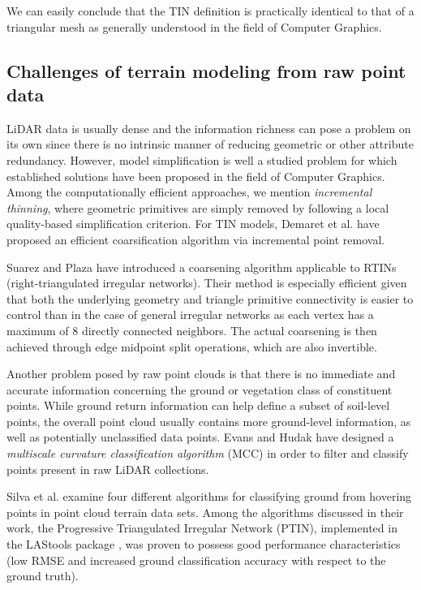 \documentclass[graybox]{svmult}
\begin{document}
We can easily conclude that the TIN definition is practically identical to that of a triangular mesh as generally understood in the field of Computer Graphics.


\subsection{Challenges of terrain modeling from raw point data}
LiDAR data is usually dense and the information richness can pose a problem on its own since there is no intrinsic manner of reducing geometric or other attribute redundancy.
However, model simplification is well a studied problem for which established solutions have been proposed in the field of Computer Graphics. Among the computationally efficient
approaches, we mention \emph{incremental thinning}, where geometric primitives are simply removed by following a local quality-based simplification criterion. For TIN models,
Demaret et al. \cite{Demaret2005} have proposed an efficient coarsification algorithm via incremental point removal.

Suarez and Plaza \cite{Suarez2009} have introduced a coarsening algorithm applicable to RTINs (right-triangulated irregular networks). Their method is especially efficient
given that both the underlying geometry and triangle primitive connectivity is easier to control than in the case of general irregular networks as each vertex has a maximum of
8 directly connected neighbors. The actual coarsening is then achieved through edge midpoint split operations, which are also invertible.

Another problem posed by raw point clouds is that there is no immediate and accurate information concerning the ground or vegetation class of constituent points.
While ground return information can help define a subset of soil-level points, the overall point cloud usually contains more ground-level information, as well as potentially
unclassified data points.
Evans and Hudak \cite{Evans2007} have designed a \emph{multiscale curvature classification algorithm} (MCC) in order to filter and classify points present in raw LiDAR collections.

Silva et al. \cite{Silva2018} examine four different algorithms for classifying ground from hovering points in point cloud terrain data sets. Among the algorithms discussed 
in their work, the Progressive Triangulated Irregular Network (PTIN), implemented in the LAStools package \cite{Isenburg2015}, was proven to possess good performance characteristics
(low RMSE and increased ground classification accuracy with respect to the ground truth). 
\end{document}
